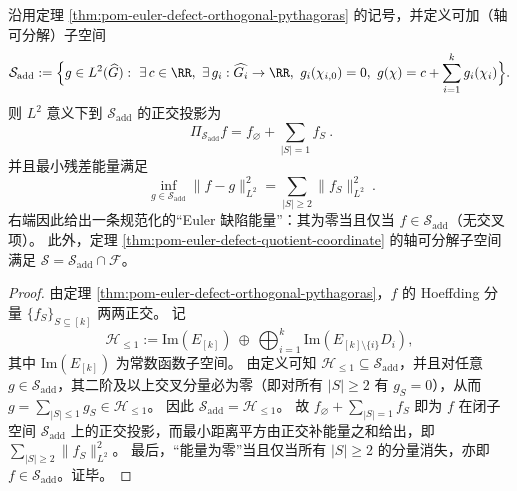 \begin{theorem}\label{thm:pom-euler-defect-min-action-gauge}
沿用定理 \ref{thm:pom-euler-defect-orthogonal-pythagoras} 的记号，并定义可加（轴可分解）子空间
\[
\mathcal S_{\mathrm{add}}
:=
\Bigl\{g\in L^2(\widehat G):\ \exists\,c\in\RR,\ \exists\,g_i:\widehat{G_i}\to\RR,\ g_i(\chi_{i,0})=0,\ g(\chi)=c+\sum_{i=1}^k g_i(\chi_i)\Bigr\}.
\]
则 \(L^2\) 意义下到 \(\mathcal S_{\mathrm{add}}\) 的正交投影为
\[
\boxed{\ \Pi_{\mathcal S_{\mathrm{add}}} f=f_{\varnothing}+\sum_{|S|=1} f_S\ }.
\]
并且最小残差能量满足
\[
\boxed{\ \inf_{g\in\mathcal S_{\mathrm{add}}}\|f-g\|_{L^2}^2=\sum_{|S|\ge 2}\|f_S\|_{L^2}^2\ }.
\]
右端因此给出一条规范化的“Euler 缺陷能量”：其为零当且仅当 \(f\in\mathcal S_{\mathrm{add}}\)（无交叉项）。
此外，定理 \ref{thm:pom-euler-defect-quotient-coordinate} 的轴可分解子空间满足 \(\mathcal S=\mathcal S_{\mathrm{add}}\cap\mathcal F\)。
\end{theorem}
\begin{proof}
由定理 \ref{thm:pom-euler-defect-orthogonal-pythagoras}，\(f\) 的 Hoeffding 分量 \(\{f_S\}_{S\subseteq[k]}\) 两两正交。
记
\[
\mathcal H_{\le 1}
:=\mathrm{Im}(E_{[k]})\ \oplus\ \bigoplus_{i=1}^k \mathrm{Im}(E_{[k]\setminus\{i\}}D_i),
\]
其中 \(\mathrm{Im}(E_{[k]})\) 为常数函数子空间。
由定义可知 \(\mathcal H_{\le 1}\subseteq \mathcal S_{\mathrm{add}}\)，并且对任意 \(g\in\mathcal S_{\mathrm{add}}\)，其二阶及以上交叉分量必为零（即对所有 \(|S|\ge 2\) 有 \(g_S=0\)），从而 \(g=\sum_{|S|\le 1} g_S\in \mathcal H_{\le 1}\)。
因此 \(\mathcal S_{\mathrm{add}}=\mathcal H_{\le 1}\)。
故 \(f_{\varnothing}+\sum_{|S|=1}f_S\) 即为 \(f\) 在闭子空间 \(\mathcal S_{\mathrm{add}}\) 上的正交投影，而最小距离平方由正交补能量之和给出，即
\(
\sum_{|S|\ge 2}\|f_S\|_{L^2}^2
\)。
最后，“能量为零”当且仅当所有 \(|S|\ge 2\) 的分量消失，亦即 \(f\in\mathcal S_{\mathrm{add}}\)。证毕。
\end{proof}

